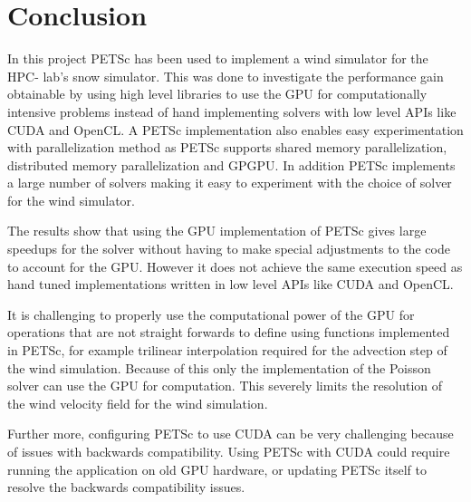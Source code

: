 \chapter{Conclusion}

In this project PETSc has been used to implement a wind simulator for the HPC-
lab's snow simulator. This was done to investigate the performance gain
obtainable by using high level libraries to use the GPU for computationally
intensive problems instead of hand implementing solvers with low level APIs like
CUDA and OpenCL. A PETSc implementation also enables easy experimentation with
parallelization method as PETSc supports shared memory parallelization,
distributed memory parallelization and GPGPU. In addition PETSc implements a
large number of solvers making it easy to experiment with the choice of solver
for the wind simulator.

The results show that using the GPU implementation of PETSc gives large speedups
for the solver without having to make special adjustments to the code to account
for the GPU. However it does not achieve the same execution speed as hand tuned
implementations written in low level APIs like CUDA and OpenCL.

It is challenging to properly use the computational power of the GPU for
operations that are not straight forwards to define using functions implemented
in PETSc, for example trilinear interpolation required for the advection step of
the wind simulation. Because of this only the implementation of the Poisson
solver can use the GPU for computation. This severely limits the resolution of
the wind velocity field for the wind simulation.

Further more, configuring PETSc to use CUDA can be very challenging because of
issues with backwards compatibility. Using PETSc with CUDA could require running
the application on old GPU hardware, or updating PETSc itself to resolve the
backwards compatibility issues.
